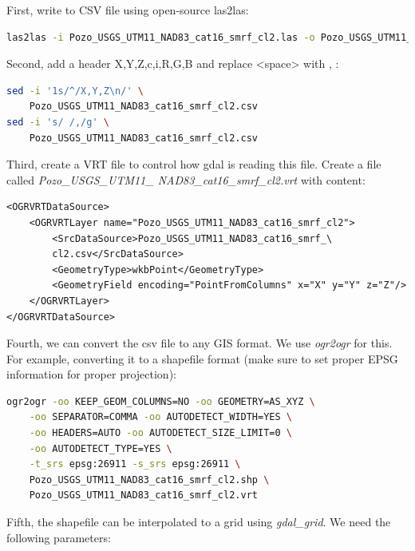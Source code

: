 \documentclass[a4paperpaper,,tablecaptionabove]{scrartcl}
\begin{document}
First, write to CSV file using open-source las2las:

\begin{lstlisting}[language=bash]
las2las -i Pozo_USGS_UTM11_NAD83_cat16_smrf_cl2.las -o Pozo_USGS_UTM11_NAD83_cat16_smrf_cl2.csv -oparse xyz
\end{lstlisting}

Second, add a header X,Y,Z,c,i,R,G,B and replace
\textless{}space\textgreater{} with , :

\begin{lstlisting}[language=bash]
sed -i '1s/^/X,Y,Z\n/' \
    Pozo_USGS_UTM11_NAD83_cat16_smrf_cl2.csv
sed -i 's/ /,/g' \
    Pozo_USGS_UTM11_NAD83_cat16_smrf_cl2.csv
\end{lstlisting}

Third, create a VRT file to control how gdal is reading this file.
Create a file called \emph{Pozo\_USGS\_UTM11\_
NAD83\_cat16\_smrf\_cl2.vrt} with content:

\begin{lstlisting}
<OGRVRTDataSource>
    <OGRVRTLayer name="Pozo_USGS_UTM11_NAD83_cat16_smrf_cl2">
        <SrcDataSource>Pozo_USGS_UTM11_NAD83_cat16_smrf_\
        cl2.csv</SrcDataSource>
        <GeometryType>wkbPoint</GeometryType>
        <GeometryField encoding="PointFromColumns" x="X" y="Y" z="Z"/>
    </OGRVRTLayer>
</OGRVRTDataSource>
\end{lstlisting}

Fourth, we can convert the csv file to any GIS format. We use
\emph{ogr2ogr} for this. For example, converting it to a shapefile
format (make sure to set proper EPSG information for proper projection):

\begin{lstlisting}[language=bash]
ogr2ogr -oo KEEP_GEOM_COLUMNS=NO -oo GEOMETRY=AS_XYZ \
    -oo SEPARATOR=COMMA -oo AUTODETECT_WIDTH=YES \
    -oo HEADERS=AUTO -oo AUTODETECT_SIZE_LIMIT=0 \
    -oo AUTODETECT_TYPE=YES \
    -t_srs epsg:26911 -s_srs epsg:26911 \
    Pozo_USGS_UTM11_NAD83_cat16_smrf_cl2.shp \
    Pozo_USGS_UTM11_NAD83_cat16_smrf_cl2.vrt
\end{lstlisting}

Fifth, the shapefile can be interpolated to a grid using
\emph{gdal\_grid}. We need the following parameters:
\end{document}
